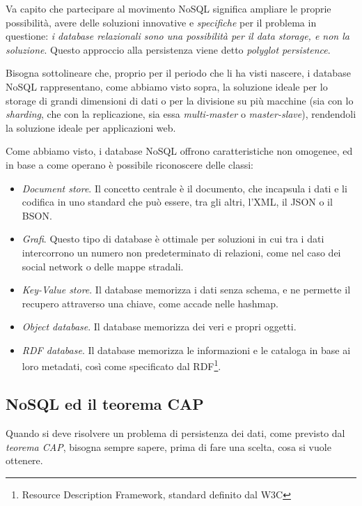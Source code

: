 Va capito che partecipare al movimento NoSQL significa ampliare le proprie possibilità, avere delle soluzioni innovative e \emph{specifiche} per il problema in questione: \emph{i database relazionali sono una possibilità per il data storage, e non la soluzione}. Questo approccio alla persistenza viene detto \emph{polyglot persistence}.

Bisogna sottolineare che, proprio per il periodo che li ha visti nascere, i database NoSQL rappresentano, come abbiamo visto sopra, la soluzione ideale per lo storage di grandi dimensioni di dati o per la divisione su più macchine (sia con lo \emph{sharding}, che con la replicazione, sia essa \emph{multi-master} o \emph{master-slave}), rendendoli la soluzione ideale per applicazioni web.

Come abbiamo visto, i database NoSQL offrono caratteristiche non omogenee, ed in base a come operano è possibile riconoscere delle classi:
\begin{itemize}
\item \emph{Document store}. Il concetto centrale è il documento, che incapsula i dati e li codifica in uno standard che può essere, tra gli altri, l'XML, il JSON o il BSON.
\item \emph{Grafi}. Questo tipo di database è ottimale per soluzioni in cui tra i dati intercorrono un numero non predeterminato di relazioni, come nel caso dei social network o delle mappe stradali.
\item \emph{Key-Value store}. Il database memorizza i dati senza schema, e ne permette il recupero attraverso una chiave, come accade nelle hashmap.
\item \emph{Object database}. Il database memorizza dei veri e propri oggetti.
\item \emph{RDF database}. Il database memorizza le informazioni e le cataloga in base ai loro metadati, così come specificato dal RDF\footnote{Resource Description Framework, standard definito dal W3C}.
\end{itemize}

\subsection{NoSQL ed il teorema CAP}
Quando si deve risolvere un problema di persistenza dei dati, come previsto dal \emph{teorema CAP}, bisogna sempre sapere, prima di fare una scelta, cosa si vuole ottenere.

